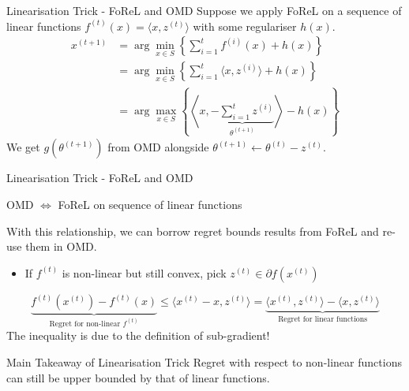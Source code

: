 \begin{frame}{Linearisation Trick - FoReL and OMD}
    Suppose we apply FoReL on a sequence of linear functions $f^{(t)}(x) = \langle x, z^{(t)} \rangle$ with some regulariser $h(x)$. \pause
    \begin{align*}
    x^{(t+1)} &= \arg\min_{x \in S} \left\{\sum_{i=1}^t f^{(i)}(x) + h(x) \right\} \\
    &= \arg\min_{x \in S} \left\{\sum_{i=1}^t \langle x, z^{(i)} \rangle  + h(x)\right\} \\
    &= \arg\max_{x \in S} \left\{\left\langle x, \underbrace{-\sum_{i=1}^t z^{(i)}}_{\theta^{(t+1)}} \right\rangle - h(x)\right\}
\end{align*}\pause
We get $g(\theta^{(t+1)})$ from OMD alongside $\theta^{(t+1)} \gets\theta^{(t)} - z^{(t)}.$
\end{frame}

\begin{frame}{Linearisation Trick - FoReL and OMD}
    \begin{block}{}
        OMD $\iff$ FoReL on sequence of linear functions
    \end{block}
    With this relationship, we can borrow regret bounds results from FoReL and re-use them in OMD.\pause
    \begin{itemize}
        \item If $f^{(t)}$ is non-linear but still convex, pick $z^{(t)} \in \partial f(x^{(t)})$\pause
    \end{itemize}
    \begin{equation}\label{eqn:linearisation_trick}
        \underbrace{f^{(t)}(x^{(t)}) - f^{(t)}(x)}_{\text{Regret for non-linear $f^{(t)}$}} \leq \langle x^{(t)} - x, z^{(t)} \rangle = \underbrace{\langle x^{(t)}, z^{(t)}\rangle - \langle x, z^{(t)} \rangle}_{\text{Regret for linear functions}}
    \end{equation}
    The inequality is due to the definition of sub-gradient!
    \begin{block}{Main Takeaway of Linearisation Trick}
        Regret with respect to non-linear functions can still be upper bounded by that of linear functions.
    \end{block}
\end{frame}

